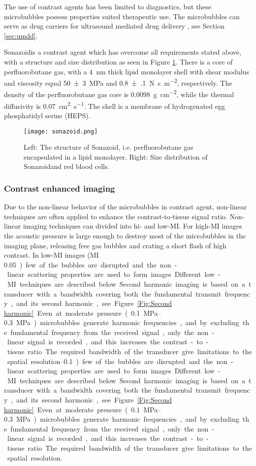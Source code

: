 The use of contrast agents has been limited to diagnostics, but these microbubbles possess properties suited therapeutic use. The microbubbles can serve as drug carriers for ultrasound mediated drug delivery \cite{Dijkmans2004}, see Section \ref{sec:umdd}.

Sonazoid\texttrademark is a contrast agent which has overcome all requirements stated above, with a structure and size distribution as seen in Figure \ref{Fig:Sonazoid}. There is a core of perfluorobutane gas, with a \SI{4}{\nano\meter} thick lipid monolayer shell with shear modulus and viscosity equal \SI{50(3)}{\mega\pascal} and \SI{0.8(1)}{\newton\second\per\meter\squared}, respectively\cite{Hoff2000}. The density of the perfluorobutane gas core is \SI{0.0098}{\gram\per\centi\meter\squared}, while the thermal diffusivity is \SI{0.07}{\centi\meter\squared\per\second}\cite{Healey2012}. The shell is a membrane of hydrogenated egg phosphatidyl serine (HEPS)\cite{Sontum2008}.

\begin{figure}[h]
  \centering
  \label{Fig:Sonazoid}
  \texttt{[image: sonazoid.png]}
  \caption{Left: The structure of Sonazoid\texttrademark , i.e. perfluorobutane gas encapsulated in a lipid monolayer. Right: Size distribution of Sonazoid\texttrademark and red blood cells\cite{Healey2012}.}
\end{figure}

\subsubsection{Contrast enhanced imaging}
\label{sec:contrast img}
Due to the non-linear behavior of the microbubbles in contrast agent, non-linear techniques are often applied to enhance the contrast-to-tissue signal ratio. Non-linear imaging techniques can divided into hi- and low-MI.  For high-MI images the acoustic pressure is large enough to destroy most of the microbubbles in the imaging plane, releasing free gas bubbles and crating a short flash of high contrast. In low-MI images (MI \SIrange{0.05}{0.1}) few of the bubbles are disrupted and the non-linear scattering properties are used to form images. Different low-MI techniques are described below.

Second harmonic imaging is based on a transducer with a bandwidth covering both the fundamental transmit frequency, and its second harmonic, see Figure \ref{Fig:Second harmonic}. Even at moderate pressure (\SIrange{0.1}{0.3}{\mega\pascal}) microbubbles generate harmonic frequencies, and by excluding the fundamental frequency from the received signal, only the non-linear signal is recorded, and this increases the contrast-to-tissue ratio. The required bandwidth of the transducer give limitations to the spatial resolution. 


